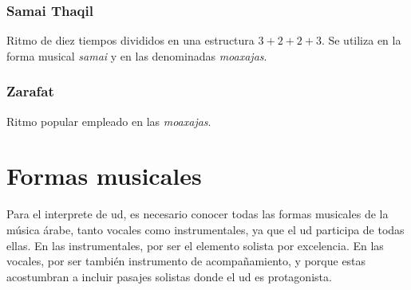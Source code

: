 

\subsubsection{Samai Thaqil}

Ritmo de diez tiempos divididos en una estructura $3+2+2+3$. Se utiliza en la forma musical \emph{samai} y en las denominadas \emph{moaxajas}.

\begin{center}
\end{center}


\subsubsection{Zarafat}

Ritmo popular empleado en las \emph{moaxajas}.

\begin{center}
\end{center}


\section{Formas musicales}

    Para el interprete de ud, es necesario conocer todas las formas musicales de la música árabe, tanto vocales como instrumentales, ya que el ud participa de todas ellas. En las instrumentales, por ser el elemento solista por excelencia. En las vocales, por ser también instrumento de acompañamiento, y porque estas acostumbran a incluir pasajes solistas donde el ud es protagonista.

